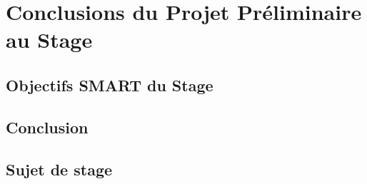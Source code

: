 \documentclass[12pt,a4paper]{report}
\begin{document}
\part{Conclusions du Projet Préliminaire au Stage}
  
\chapter{Objectifs SMART du Stage}
\chapter{Conclusion}

\begin{appendix}
\chapter{Sujet de stage}
\end{appendix}
\end{document}
